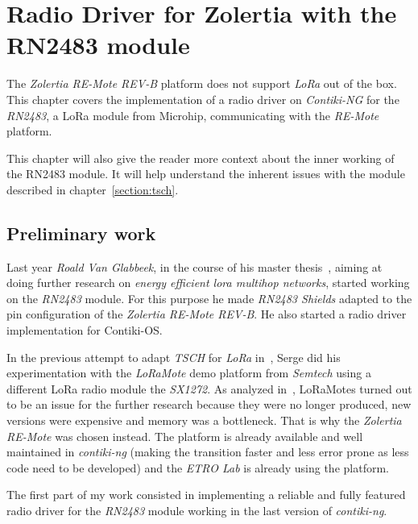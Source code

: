 \chapter{Radio Driver for Zolertia with the RN2483 module\label{section:radio}}


The \emph{Zolertia RE-Mote REV-B} platform does not support \emph{LoRa} out of
the box. This chapter covers the implementation of a radio driver on
\emph{Contiki-NG} for the \emph{RN2483}, a LoRa module from Microhip,
communicating with the \emph{RE-Mote} platform.

This chapter will also give the reader more context about the inner working of
the RN2483 module.
It will help understand the inherent issues with the module
described in chapter~\ref{section:tsch}.

\section{Preliminary work}

Last year \emph{Roald Van Glabbeek}, in the course of his master thesis~\cite{8847137}, 
aiming at doing further research on \emph{energy efficient lora multihop networks}, 
started working on the \emph{RN2483} module.
For this purpose he made \emph{RN2483 Shields} adapted to the pin
configuration of the \emph{Zolertia RE-Mote REV-B}. He also started a radio driver
implementation for Contiki-OS\@.

In the previous attempt to adapt \emph{TSCH} for \emph{LoRa}
in~\cite{njomgang_2018}, Serge did his experimentation with the \emph{LoRaMote}
demo platform from \emph{Semtech} using a different LoRa radio module the
\emph{SX1272}. 
As analyzed in~\cite{8847137}, LoRaMotes turned out to be an issue for the
further research because they were no longer produced, 
new versions were expensive and memory was a bottleneck.
That is why the \emph{Zolertia RE-Mote} was chosen instead. 
The platform is already available 
and well maintained in \emph{contiki-ng} (making the transition faster and less
error prone as less code need to be developed) and the \emph{ETRO Lab} is
already using the platform.

The first part of my work consisted in implementing a reliable
and fully featured radio driver for the \emph{RN2483} module working in the last
version of \emph{contiki-ng}.

